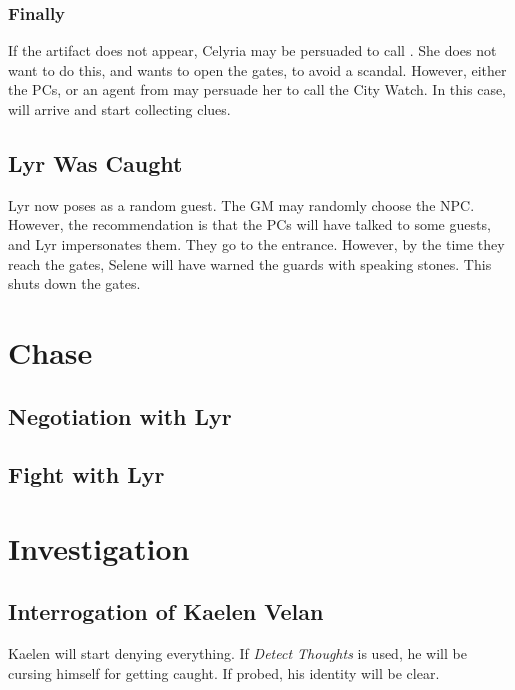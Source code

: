 \documentclass[twocolumn]{dndbook}
\begin{document}
\subsubsection*{Finally}
If the artifact does not appear, Celyria may be persuaded to call .
She does not want to do this, and wants to open the gates, to avoid a scandal.
However, either the PCs, or an agent from  may persuade her to call the City Watch.
In this case,  will arrive and start collecting clues.

\subsection{Lyr Was Caught}
\label{subsec:lyr_was_caught}
Lyr now poses as a random guest.
The GM may randomly choose the NPC. However, the recommendation is that the PCs will have talked to some guests, and Lyr impersonates them.
They go to the entrance. However, by the time they reach the gates, Selene will have warned the guards with speaking stones.
This shuts down the gates.




\section{Chase}
\label{sec:chase}

\subsection{Negotiation with Lyr}
\label{subsec:negotiation_with_lyr}

\subsection{Fight with Lyr}
\label{subsec:fight_with_lyr}


\section{Investigation}
\label{sec:investigation}

\subsection{Interrogation of Kaelen Velan}
Kaelen will start denying everything.
If \emph{Detect Thoughts} is used, he will be cursing himself for getting caught. If probed, his identity will be clear.
\end{document}
